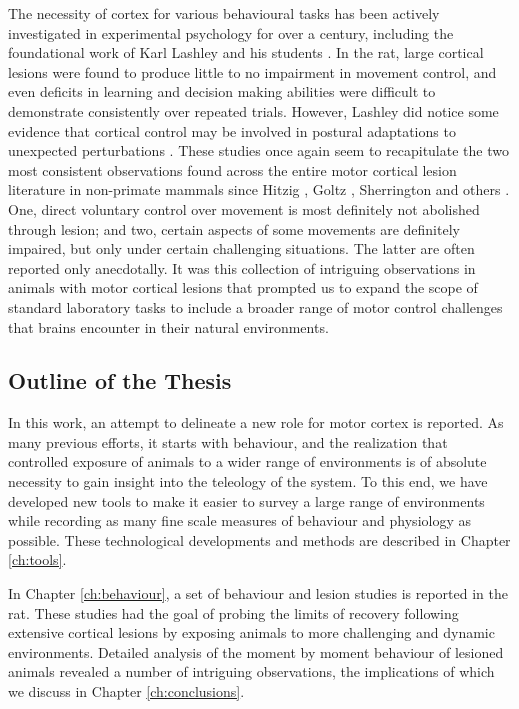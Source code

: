 The necessity of cortex for various behavioural tasks has been actively investigated in experimental psychology for over a century, including the foundational work of Karl Lashley and his students \cite{Lashley1921a,Lashley1950a}. In the rat, large cortical lesions were found to produce little to no impairment in movement control, and even deficits in learning and decision making abilities were difficult to demonstrate consistently over repeated trials. However, Lashley did notice some evidence that cortical control may be involved in postural adaptations to unexpected perturbations \cite{Lashley1921a}. These studies once again seem to recapitulate the two most consistent observations found across the entire motor cortical lesion literature in non-primate mammals since Hitzig \cite{Fritsch1870}, Goltz \cite{Goltz1888}, Sherrington \cite{Sherrington1885} and others \cite{Oakley1979,Terry1989}. One, direct voluntary control over movement is most definitely not abolished through lesion; and two, certain aspects of some movements are definitely impaired, but only under certain challenging situations. The latter are often reported only anecdotally. It was this collection of intriguing observations in animals with motor cortical lesions that prompted us to expand the scope of standard laboratory tasks to include a broader range of motor control challenges that brains encounter in their natural environments.

\subsection{Outline of the Thesis}

In this work, an attempt to delineate a new role for motor cortex is reported. As many previous efforts, it starts with behaviour, and the realization that controlled exposure of animals to a wider range of environments is of absolute necessity to gain insight into the teleology of the system. To this end, we have developed new tools to make it easier to survey a large range of environments while recording as many fine scale measures of behaviour and physiology as possible. These technological developments and methods are described in Chapter \ref{ch:tools}.

In Chapter \ref{ch:behaviour}, a set of behaviour and lesion studies is reported in the rat. These studies had the goal of probing the limits of recovery following extensive cortical lesions by exposing animals to more challenging and dynamic environments. Detailed analysis of the moment by moment behaviour of lesioned animals revealed a number of intriguing observations, the implications of which we discuss in Chapter \ref{ch:conclusions}.

